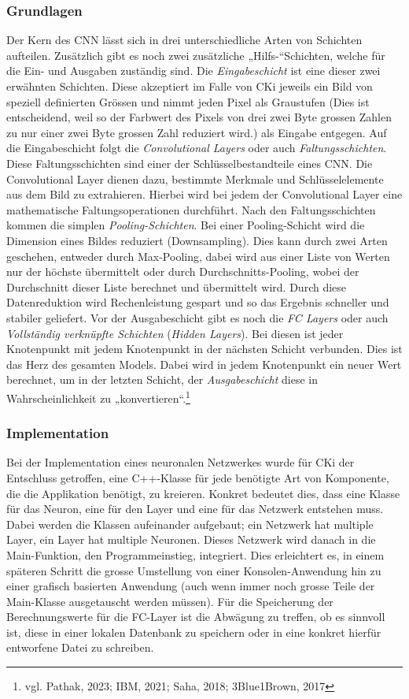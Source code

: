 \subsubsection{Grundlagen}
\label{sec:AnalyseGrundlagen}
Der Kern des CNN lässt sich in drei unterschiedliche Arten von Schichten aufteilen. Zusätzlich gibt es noch zwei zusätzliche „Hilfs-“Schichten, welche für die Ein- und Ausgaben zuständig sind. 
Die \textit{Eingabeschicht} ist eine dieser zwei erwähnten Schichten. Diese akzeptiert im Falle von CKi jeweils ein Bild von speziell definierten Grössen und nimmt jeden Pixel als Graustufen (Dies ist entscheidend, weil so der Farbwert des Pixels von drei zwei Byte grossen Zahlen zu nur einer zwei Byte grossen Zahl reduziert wird.) als Eingabe entgegen. 
Auf die Eingabeschicht folgt die \textit{Convolutional Layers} oder auch \textit{Faltungsschichten}. Diese Faltungsschichten sind einer der Schlüsselbestandteile eines CNN. Die Convolutional Layer dienen dazu, bestimmte Merkmale und Schlüsselelemente aus dem Bild zu extrahieren. Hierbei wird bei jedem der Convolutional Layer eine 
mathematische Faltungsoperationen durchführt. 
Nach den Faltungsschichten kommen die simplen \textit{Pooling-Schichten}. Bei einer Pooling-Schicht wird die Dimension eines Bildes reduziert (Downsampling). Dies kann durch zwei Arten geschehen, entweder durch Max-Pooling, dabei wird aus einer Liste von Werten nur der höchste übermittelt oder durch Durchschnitts-Pooling, wobei der Durchschnitt dieser Liste berechnet und übermittelt wird. Durch diese Datenreduktion wird Rechenleistung gespart und so das Ergebnis schneller und stabiler geliefert. 
Vor der Ausgabeschicht gibt es noch die \textit{FC Layers} oder auch \textit{Vollständig verknüpfte Schichten} (\textit{Hidden Layers}). Bei diesen ist jeder Knotenpunkt mit jedem Knotenpunkt in der nächsten Schicht verbunden. Dies ist das Herz des gesamten Models. Dabei wird in jedem Knotenpunkt ein neuer Wert berechnet, um in der letzten Schicht, der \textit{Ausgabeschicht} diese in Wahrscheinlichkeit zu „konvertieren“.\footnote{vgl. Pathak, 2023; IBM, 2021; Saha, 2018; 3Blue1Brown, 2017}

\subsubsection{Implementation}
\label{sec:AnalyseImplementation}
Bei der Implementation eines neuronalen Netzwerkes wurde für CKi der Entschluss getroffen, eine C++-Klasse für jede benötigte Art von Komponente, die die Applikation benötigt, zu kreieren. Konkret bedeutet dies, dass eine Klasse für das Neuron, eine für den Layer und eine für das Netzwerk entstehen muss. Dabei werden die Klassen aufeinander aufgebaut; ein Netzwerk hat multiple Layer, ein Layer hat multiple Neuronen. Dieses Netzwerk wird danach in die Main-Funktion, den Programmeinstieg, integriert. Dies erleichtert es, in einem späteren Schritt die grosse Umstellung von einer Konsolen-Anwendung hin zu einer grafisch basierten Anwendung (auch wenn immer noch grosse Teile der Main-Klasse ausgetauscht werden müssen). Für die Speicherung der Berechnungswerte für die FC-Layer ist die Abwägung zu treffen, ob es sinnvoll ist, diese in einer lokalen Datenbank zu speichern oder in eine konkret hierfür entworfene Datei zu schreiben.

